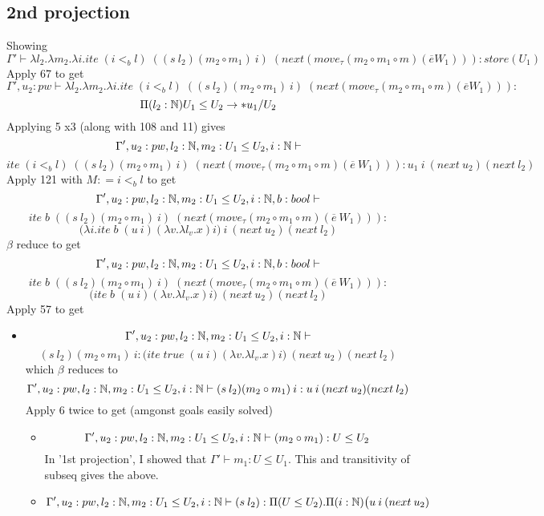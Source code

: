 \documentclass{article}
\begin{document}
\begin{itemize}
\begin{itemize}
    \subsection*{2nd projection}
    Showing 
    \[\Gamma' \vdash \lambda l_2. \lambda m_2. \lambda i. ite \; (i <_b l) \;
((s \: l_2) (m_2 \circ m_1)\: i) \; (next
(move_{\tau}(m_2 \circ m_1 \circ m) 
(\overline{e} W_1))) :store(U_1)\]
Apply 67 to get
\[\Gamma', u_2: pw \vdash \lambda l_2. \lambda m_2. \lambda i. ite \; (i <_b l) \;
((s \: l_2) (m_2 \circ m_1)\: i) \; (next
(move_{\tau}(m_2 \circ m_1 \circ m) 
(\overline{e} W_1))) :\]
\[\Pi(l_2 : \mathbb{N})U_1 \leq U_2 \rightarrow *u_1/ U_2
\]
Applying 5 x3 (along with 108 and 11)
gives 
\[\Gamma', u_2: pw, l_2: \mathbb{N}, m_2:U_1 \leq U_2, i : \mathbb{N}  \vdash\] \[ ite \; (i <_b l) \;
((s \: l_2) (m_2 \circ m_1)\: i) \; (next
(move_{\tau}(m_2 \circ m_1 \circ m) 
(\overline{e}\: W_1))) : u_1 \: i \: (next \: u_2)
(next \: l_2)
\]
Apply 121 with $M : = i<_b l$ to get  
\[\Gamma', u_2: pw, l_2: \mathbb{N}, m_2:U_1 \leq U_2, i : \mathbb{N}, b: bool  \vdash\] \[ ite \; b \;
((s \: l_2) (m_2 \circ m_1)\: i) \; (next
(move_{\tau}(m_2 \circ m_1 \circ m) 
(\overline{e}\: W_1))) :\]
\[\Big( \lambda i. ite \; b\; (u\:i)(\lambda v. \lambda l_v. x) i \Big)\: i \: (next \: u_2)
(next \: l_2)
\]
$\beta$ reduce to get
\[\Gamma', u_2: pw, l_2: \mathbb{N}, m_2:U_1 \leq U_2, i : \mathbb{N}, b: bool  \vdash\] \[ ite \; b \;
((s \: l_2) (m_2 \circ m_1)\: i) \; (next
(move_{\tau}(m_2 \circ m_1 \circ m) 
(\overline{e}\: W_1))) :\]
\[ \Big( ite \; b\; (u\:i)(\lambda v. \lambda l_v. x) i \Big) \: (next \: u_2)
(next \: l_2)
\]
Apply 57 to get
\begin{itemize}
    \item
      \[\Gamma', u_2: pw, l_2: \mathbb{N}, m_2:U_1 \leq U_2, i : \mathbb{N} \vdash\] \[(s \: l_2) (m_2 \circ m_1) \: i :\Big( ite \; true\; (u\:i)(\lambda v. \lambda l_v. x) i \Big) \: (next \: u_2)
(next \: l_2)
\]
    which $\beta$ reduces to 
    \[\Gamma', u_2: pw, l_2: \mathbb{N}, m_2:U_1 \leq U_2, i : \mathbb{N} \vdash (s \: l_2) (m_2 \circ m_1)\:i  :u \: i \: (next \: u_2)
(next \: l_2)
\]
Apply 6 twice to get (amgonst goals easily solved)
\begin{itemize}
    \item  \[\Gamma', u_2: pw, l_2: \mathbb{N}, m_2:U_1 \leq U_2, i : \mathbb{N} \vdash (m_2 \circ m_1): U \leq U_2
\]
In '1st projection', I showed that $\Gamma' \vdash m_1 : U \leq U_1$. This and transitivity of subseq gives the above.
\item \[\Gamma', u_2: pw, l_2: \mathbb{N}, m_2:U_1 \leq U_2, i : \mathbb{N} \vdash (s \: l_2) : \Pi(U \leq U_2). \Pi(i: \mathbb{N})\big(u \: i \: (next \: u_2)
\]
\end{itemize}
\end{itemize}
\end{itemize}
\end{itemize}
\end{document}

